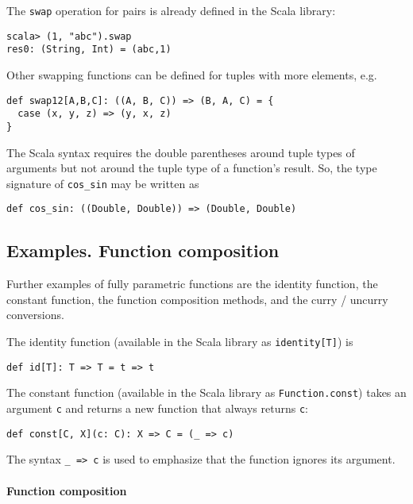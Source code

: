 The \lstinline!swap! operation for pairs is already defined in the
Scala library:
\begin{lstlisting}
scala> (1, "abc").swap
res0: (String, Int) = (abc,1)
\end{lstlisting}
Other swapping functions can be defined for tuples with more elements,
e.g.
\begin{lstlisting}
def swap12[A,B,C]: ((A, B, C)) => (B, A, C) = {
  case (x, y, z) => (y, x, z)
}
\end{lstlisting}
The Scala syntax requires the double parentheses around tuple types
of arguments but not around the tuple type of a function's result.
So, the type signature of \lstinline!cos_sin! may be written as
\begin{lstlisting}
def cos_sin: ((Double, Double)) => (Double, Double)
\end{lstlisting}


\subsection{Examples. Function composition\label{subsec:Examples-of-fully-parametric}}

Further examples of fully parametric functions are the identity function,
the constant function, the function composition methods, and the curry
/ uncurry conversions. 

The identity function (available in the
Scala library as \lstinline!identity[T]!) is
\begin{lstlisting}
def id[T]: T => T = t => t
\end{lstlisting}
The constant function (available in the
Scala library as \lstinline!Function.const!) takes an argument \lstinline!c!
and returns a new function that always returns \lstinline!c!:
\begin{lstlisting}
def const[C, X](c: C): X => C = (_ => c)
\end{lstlisting}
The syntax \lstinline!_ => c! is used to emphasize that the function
ignores its argument.

\paragraph{Function composition}

